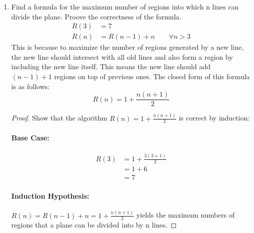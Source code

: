 \documentclass{article}
\begin{document}
\begin{enumerate} [label=\textbf{\arabic*}.]
\begin{enumerate} [label=\textbf{\alph*}.]
				\\
				3 lines can divide the plane into a maximum of 7 regions.

			\item Find a formula for the maximum number of regions into which n lines
				can divide the plane. Proove the correctness of the formula.
					\begin{align*}
					R(3) &= 7\\
					R(n) &= R(n-1) + n \qquad \forall n > 3
					\end{align*}
				This is because to maximize the number of regions generated by a new
				line, the new line should intersect with all old lines and also form a
				region by including the new line itself. This means the new line should
				add $(n-1) + 1$ regions on top of previous ones. The closed form of this
				formula is as follows:
					$$R(n) = 1 + \frac{n(n+1)}{2}$$

				\begin{proof} Show that the algorithm $R(n) = 1 + \frac{n(n+1)}{2}$ is
					correct by induction:
					\paragraph{Base Case: }
						\begin{align*}
						R(3) &= 1 + \frac{3(3+1)}{2}\\
						     &= 1 + 6\\
						     &=7
						\end{align*}

					\paragraph{Induction Hypothesis: }$R(n) = R(n-1) + n = 1 + \frac{n(n+1)}{2}$ yields
					the maximum numbers of regions that a plane can be divided into by n
					lines.


\end{proof}
\end{enumerate}
\end{enumerate}
\end{document}
